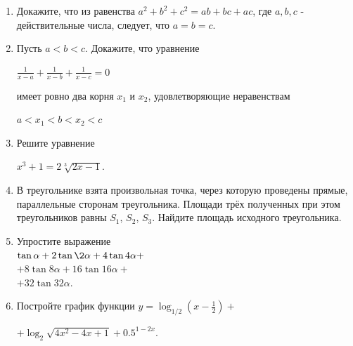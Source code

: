 \documentclass[a4paper,9pt]{article}
\begin{document}
\begin{multicols}{3}
\begin{enumerate}
    \item Докажите, что из равенства \(a^2+b^2+c^2=ab+bc+ac\), где \(a,b,c\) - действительные числа, следует, что \(a=b=c\).
    \item Пусть \(a<b<c\). Докажите, что уравнение
    \begin{center}
        \(\frac{1}{x-a}+\frac{1}{x-b}+\frac{1}{x-c}=0\)
    \end{center}
    имеет ровно два корня \(x_1\) и \(x_2\), удовлетворяющие неравенствам
    \begin{center}
        \(a<x_1<b<x_2<c\)
    \end{center}
    \item Решите уравнение
    \begin{center}
        \(x^3+1=2\sqrt[3]{2x-1}\).
    \end{center}
    \item В треугольнике взята произвольная точка, через которую проведены прямые, параллельные сторонам треугольника. Площади трёх полученных при этом треугольников равны \(S_1\), \(S_2\), \(S_3\). Найдите площадь исходного треугольника.
    \item Упростите выражение \\[0.5em]
    \(\tan\alpha+2\tan\2\alpha+4\tan4\alpha+\) \\
    \(+8\tan8\alpha+16\tan16\alpha+\) \\
    \(+32\tan32\alpha\).
    \item Постройте график функции
    \(y=\log_{1/2}(x-\frac{1}{2})+\)
    \begin{center}
        \(+\log_{2}\sqrt{4x^2-4x+1}+0.5^{1-2x}\).
    \end{center}
\end{enumerate}
\end{multicols}
\end{document}
